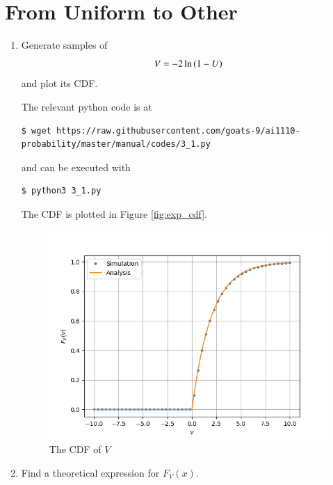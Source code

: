\documentclass[journal,12pt,twocolumn]{IEEEtran}
\renewcommand\thesection{\arabic{section}}
\begin{document}
\section{From Uniform to Other}
\begin{enumerate}[label=\thesection.\arabic*
,ref=\thesection.\theenumi]
%
\item
Generate samples of 
%
\begin{equation}
V = -2\ln\left(1-U\right)
\end{equation}
%
and plot its CDF. 

\solution
The relevant python code is at
\begin{lstlisting}
$ wget https://raw.githubusercontent.com/goats-9/ai1110-probability/master/manual/codes/3_1.py
\end{lstlisting}
and can be executed with
\begin{lstlisting}
$ python3 3_1.py
\end{lstlisting}
The CDF is plotted in Figure \eqref{fig:exp_cdf}.
\begin{figure}[!htb] 
\centering
\includegraphics[width=\columnwidth]{./figs/3_1.png}
\caption{The CDF of $V$}
\label{fig:exp_cdf}
\end{figure}

\item Find a theoretical expression for $F_V(x)$.


\end{enumerate}
\end{document}
